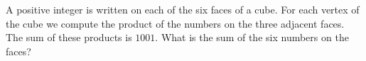 A positive integer is written on each of the six faces of a cube. For each vertex of the cube we compute the product of the numbers on the three adjacent faces. The sum of these products is $1001$. What is the sum of the six numbers on the faces?